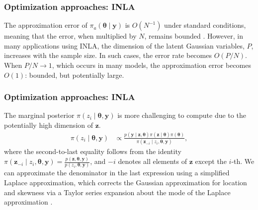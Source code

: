 \documentclass[12pt, compress]{beamer}
\begin{document}
\begin{frame}
	\frametitle{Optimization approaches: INLA}
The approximation error of $\pi_a(\boldsymbol{\theta} \mid \boldsymbol{y})$ is \( O(N^{-1}) \) under standard conditions, meaning that the error, when multiplied by \( N \), remains bounded \cite{Tierney1986, rue2009approximate}. However, in many applications using INLA, the dimension of the latent Gaussian variables, \( P \), increases with the sample size. In such cases, the error rate becomes \( O(P/N) \). When \( P/N \rightarrow 1 \), which occurs in many models, the approximation error becomes \( O(1) \): bounded, but potentially large. 
\end{frame}

\begin{frame}
	\frametitle{Optimization approaches: INLA}
The marginal posterior $\pi(z_i \mid \boldsymbol{\theta}, \boldsymbol{y})$ is more challenging to compute due to the potentially high dimension of $\boldsymbol{z}$. 
\begin{align*}
	\pi(z_i\mid \boldsymbol{\theta},\boldsymbol{y})&\propto \frac{p(\boldsymbol{y}\mid \boldsymbol{z},\boldsymbol{\theta})\pi(\boldsymbol{z}\mid\boldsymbol{\theta})\pi(\boldsymbol{\theta})}{\pi(\boldsymbol{z}_{-i}\mid z_i,\boldsymbol{\theta},\boldsymbol{y})}, 
\end{align*}
where the second-to-last equality follows from the identity $\pi(\boldsymbol{z}_{-i} \mid z_i, \boldsymbol{\theta}, \boldsymbol{y}) = \frac{p(\boldsymbol{z}, \boldsymbol{\theta}, \boldsymbol{y})}{p(z_i, \boldsymbol{\theta}, \boldsymbol{y})}$, and $-i$ denotes all elements of $\boldsymbol{z}$ except the $i$-th. 
We can approximate the denominator in the last expression using a simplified Laplace approximation, which corrects the Gaussian approximation for location and skewness via a Taylor series expansion about the mode of the Laplace approximation \citep{rue2009approximate}.
\end{frame}
\end{document}
